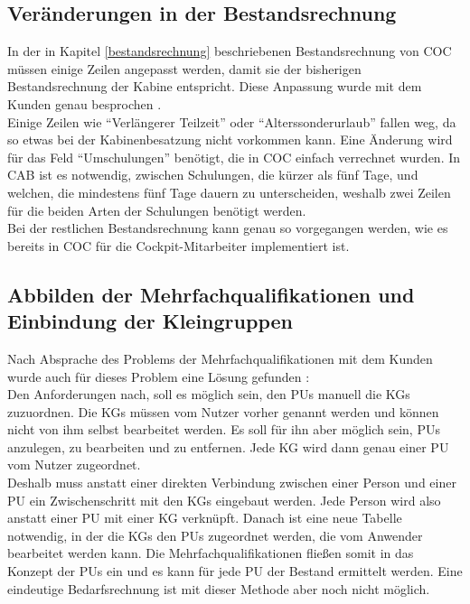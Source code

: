 \documentclass [12pt, a4paper, oneside, titlepage, ngerman]{article}
\begin{document}
\subsection{Veränderungen in der Bestandsrechnung} %
In der in Kapitel \ref{bestandsrechnung} beschriebenen Bestandsrechnung von \ac{COC} müssen einige Zeilen angepasst werden, damit sie der bisherigen Bestandsrechnung der Kabine entspricht. Diese Anpassung wurde mit dem Kunden genau besprochen \cite[vgl.][]{bestanddet}. \\
Einige Zeilen wie "`Verlängerer Teilzeit"' oder "`Alterssonderurlaub"' fallen weg, da so etwas bei der Kabinenbesatzung nicht vorkommen kann. Eine Änderung wird für das Feld "`Umschulungen"' benötigt, die in \ac{COC} einfach verrechnet wurden. In \ac{CAB} ist es notwendig, zwischen Schulungen, die kürzer als fünf Tage, und welchen, die mindestens fünf Tage dauern zu unterscheiden, weshalb zwei Zeilen für die beiden Arten der Schulungen benötigt werden. \\ %
Bei der restlichen Bestandsrechnung kann genau so vorgegangen werden, wie es bereits in \ac{COC} für die Cockpit-Mitarbeiter implementiert ist.


\subsection{Abbilden der Mehrfachqualifikationen und Einbindung der Kleingruppen} %
Nach Absprache des Problems der Mehrfachqualifikationen mit dem Kunden wurde auch für dieses Problem eine Lösung gefunden \cite[vgl.][]{Gespraech4}: \\
Den Anforderungen nach, soll es möglich sein, den \acp{PU} manuell die \acp{KG} zuzuordnen. Die \acp{KG} müssen vom Nutzer vorher genannt werden und können nicht von ihm selbst bearbeitet werden. Es soll für ihn aber möglich sein, \acp{PU} anzulegen, zu bearbeiten und zu entfernen. Jede \ac{KG} wird dann genau einer \ac{PU} vom Nutzer zugeordnet. \\
Deshalb muss anstatt einer direkten Verbindung zwischen einer Person und einer \ac{PU} ein Zwischenschritt mit den \acp{KG} eingebaut werden. Jede Person wird also anstatt einer \ac{PU} mit einer \ac{KG} verknüpft. Danach ist eine neue Tabelle notwendig, in der die \acp{KG} den \acp{PU} zugeordnet werden, die vom Anwender bearbeitet werden kann. Die Mehrfachqualifikationen fließen somit in das Konzept der \acp{PU} ein und es kann für jede \ac{PU} der Bestand ermittelt werden. Eine eindeutige Bedarfsrechnung ist mit dieser Methode aber noch nicht möglich. \\
\end{document}
